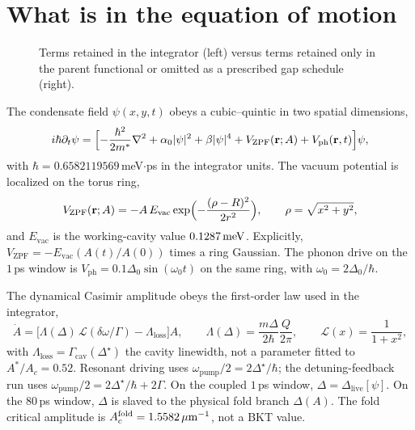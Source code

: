 \documentclass[11pt,letterpaper]{article}
\begin{document}
\section{What is in the equation of motion}
\label{sec:eom}

\begin{figure}[H]
\centering

\caption{Terms retained in the integrator (left) versus terms retained only in the parent functional or omitted as a prescribed gap schedule (right).}
\label{fig:trunc-s}
\end{figure}

The condensate field $\psi(x,y,t)$ obeys a cubic--quintic \GPE{} in two spatial dimensions,
\begin{equation}
i\hbar\partial_t\psi=\Bigl[-\frac{\hbar^2}{2m^*}\nabla^2+\alpha_0|\psi|^2+\beta|\psi|^4+V_{\mathrm{ZPF}}(\mathbf{r};A)+V_{\mathrm{ph}}(\mathbf{r},t)\Bigr]\psi,
\label{eq:gpe}
\end{equation}
with $\hbar=0.6582119569$\,meV$\cdot$ps in the integrator units. The vacuum potential is localized on the torus ring,
\begin{equation}
V_{\mathrm{ZPF}}(\mathbf{r};A)=-A\,E_{\mathrm{vac}}\exp\Bigl(-\frac{(\rho-R)^2}{2r^2}\Bigr),\qquad\rho=\sqrt{x^2+y^2},
\end{equation}
and $E_{\mathrm{vac}}$ is the working-cavity value $0.1287\,\mathrm{meV}$. Explicitly, $V_{\mathrm{ZPF}}=-E_{\mathrm{vac}}(A(t)/A(0))$ times a ring Gaussian. The phonon drive on the $1$\,ps window is $V_{\mathrm{ph}}=0.1\Delta_0\sin(\omega_0 t)$ on the same ring, with $\omega_0=2\Delta_0/\hbar$.

The dynamical Casimir amplitude obeys the first-order law used in the integrator,
\begin{equation}
\dot A=\bigl[\Lambda(\Delta)\,\mathcal{L}(\delta\omega/\Gamma)-\Lambda_{\mathrm{loss}}\bigr]A,\qquad
\Lambda(\Delta)=\frac{m\Delta}{2\hbar}\frac{Q}{2\pi},\qquad
\mathcal{L}(x)=\frac{1}{1+x^2},
\label{eq:dce}
\end{equation}
with $\Lambda_{\mathrm{loss}}=\Gamma_{\mathrm{cav}}(\Delta^\star)$ the cavity linewidth, not a parameter fitted to $A^*/A_c=0.52$. Resonant driving uses $\omega_{\mathrm{pump}}/2=2\Delta^\star/\hbar$; the detuning-feedback run uses $\omega_{\mathrm{pump}}/2=2\Delta^\star/\hbar+2\Gamma$. On the coupled $1$\,ps window, $\Delta=\Delta_{\mathrm{live}}[\psi]$. On the $80$\,ps window, $\Delta$ is slaved to the physical fold branch $\Delta(A)$. The fold critical amplitude is $A_c^{\mathrm{fold}}=1.5582\,\mu\mathrm{m}^{-1}$, not a BKT value.
\end{document}
